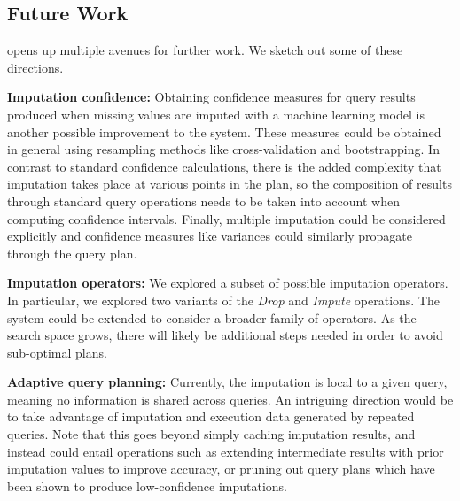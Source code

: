 \subsection{Future Work}
\ProjectName{} opens up multiple avenues for further work. We sketch out some of these
directions.

\textbf{Imputation confidence:} Obtaining confidence measures for query results
produced when missing values are imputed with a machine learning model is
another possible improvement to the system. These measures could be obtained in general
using resampling methods like cross-validation and bootstrapping\cite{kohavi1995study}.
In contrast to standard confidence calculations, there is the added complexity that
imputation takes place at various points in the plan, so the composition of results
through standard query operations needs to be taken into account when computing confidence intervals.
Finally, multiple imputation could be considered explicitly and confidence measures like variances could
similarly propagate through the query plan.

\textbf{Imputation operators:} We explored a subset of possible imputation operators.
In particular, we explored two variants of the \textit{Drop} and \textit{Impute} operations. The system
could be extended to consider a broader family of operators. As the search space grows,
there will likely be additional steps needed in order to avoid sub-optimal plans.

\textbf{Adaptive query planning:} Currently, the imputation is local to a given query, meaning
no information is shared across queries. An intriguing direction would be to take advantage
of imputation and execution data generated by repeated queries. Note that this goes beyond
simply caching imputation results, and instead could entail operations such as extending
intermediate results with prior imputation values to improve accuracy, or pruning out
query plans which have been shown to produce low-confidence imputations.

